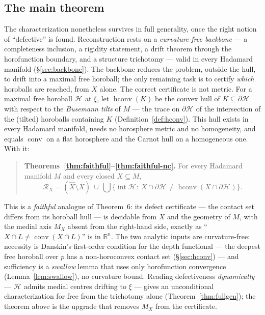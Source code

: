 \documentclass[11pt]{article}
\theoremstyle{remark}
\newcommand{\R}{\mathbb{R}}
\newcommand{\X}{X}
\newcommand{\Xhat}{\widehat{\X}}
\newcommand{\Mx}{M_{\X}}
\newcommand{\Rx}{\mathcal{R}_{\X}}
\newcommand{\Hb}[1]{\mathcal{H}_{#1}}
\newcommand{\conv}{\operatorname{conv}}
\newcommand{\hconv}{\operatorname{hconv}}
\begin{document}
\subsection*{The main theorem}

The characterization nonetheless survives in full generality, once the
right notion of ``defective'' is found. Reconstruction rests on a
\emph{curvature-free backbone} --- a completeness inclusion, a
rigidity statement, a drift theorem through the horofunction boundary,
and a structure trichotomy --- valid in every Hadamard manifold
(\S\ref{sec:backbone}). The backbone reduces the problem, outside the
hull, to drift into a maximal free horoball; the only remaining task is
to certify \emph{which} horoballs are reached, from $X$ alone. The
correct certificate is not metric. For a maximal free horoball $\Hb{}$
at $\xi$, let $\hconv(K)$ be the convex hull of $K\subseteq\partial\Hb{}$
with respect to the \emph{Busemann tilts} of $M$ --- the trace on
$\partial\Hb{}$ of the intersection of the (tilted) horoballs
containing $K$ (Definition~\ref{def:hconv}). This hull exists in every
Hadamard manifold, needs no horosphere metric and no homogeneity, and
equals $\conv$ on a flat horosphere and the Carnot hull on a
homogeneous one. With it:

\begin{quote}
\textbf{Theorems~\ref{thm:faithful}--\ref{thm:faithful-nc}.} For every
Hadamard manifold $M$ and every closed $\X\subseteq M$,
\[
  \Rx=(\Xhat\setminus X)\ \cup\
  \bigcup\bigl\{\operatorname{int}\Hb{}:\ X\cap\partial\Hb{}\neq
  \hconv(X\cap\partial\Hb{})\bigr\}.
\]
\end{quote}

This is a \emph{faithful} analogue of Theorem~6: its defect
certificate --- the contact set differs from its horoball hull --- is
decidable from $X$ and the geometry of $M$, with the medial axis
$\Mx$ absent from the right-hand side, exactly as
``$X\cap L\neq\conv(X\cap L)$'' is in $\R^{n}$. The two analytic inputs
are curvature-free: necessity is Danskin's first-order condition for
the depth functional --- the deepest free horoball over $p$ has a
non-horoconvex contact set (\S\ref{sec:hconv}) --- and sufficiency is a
\emph{swallow} lemma that uses only horofunction convergence
(Lemma~\ref{lem:swallow}), no curvature bound. Reading defectiveness
\emph{dynamically} --- $\Hb{}$ admits medial centres drifting to $\xi$
--- gives an unconditional characterization for free from the
trichotomy alone (Theorem~\ref{thm:fullgen}); the theorem above is the
upgrade that removes $\Mx$ from the certificate.
\end{document}
